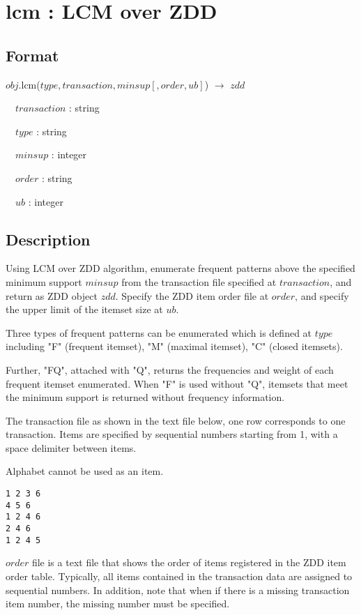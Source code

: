 
\section{lcm : LCM over ZDD\label{sect:lcm}}
\subsection*{Format}

$obj$.lcm($type,transaction,minsup[,order,ub]$) $\rightarrow$ $zdd$

~~$transaction$ : string

~~$type$ : string

~~$minsup$ : integer

~~$order$ : string

~~$ub$ : integer

\subsection*{Description}

Using LCM over ZDD algorithm, enumerate frequent patterns above the specified minimum support $minsup$ from the transaction file specified at $transaction$, and return as ZDD object $zdd$.
Specify the ZDD item order file at $order$, and specify the upper limit of the itemset size at $ub$. 

Three types of frequent patterns can be enumerated which is defined at $type$ including "F" (frequent itemset), "M" (maximal itemset), "C" (closed itemsets). 

Further, "FQ", attached with "Q", returns the frequencies and weight of each frequent itemset enumerated. 
When "F" is used without "Q",  itemsets that meet the minimum support is returned without frequency information. 

The transaction file as shown in the text file below, one row corresponds to one transaction. Items are specified by sequential numbers starting from 1, with a space delimiter between items. 

Alphabet cannot be used as an item. 

\begin{Verbatim}[baselinestretch=0.7,frame=single]
1 2 3 6
4 5 6
1 2 4 6
2 4 6
1 2 4 5
\end{Verbatim}

$order$ file is a text file that shows the order of items registered in the ZDD item order table. 
Typically, all items contained in the transaction data are assigned to sequential numbers. 
In addition, note that when if there is a missing transaction item number, the missing number must be specified. 

